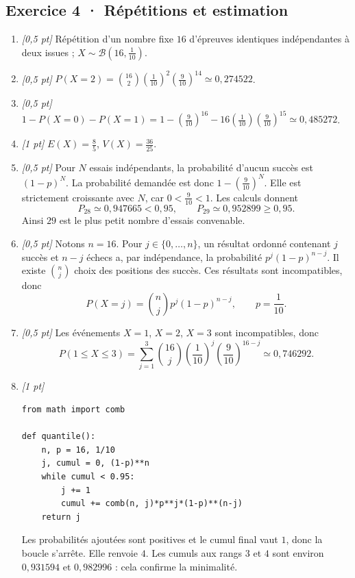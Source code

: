 \subsection*{Exercice 4 · Répétitions et estimation}\begin{enumerate}

\item \textit{[0,5 pt]} Répétition d'un nombre fixe $16$ d'épreuves identiques indépendantes à deux issues ; $X\sim\mathcal B(16,\frac{1}{10})$.

\item \textit{[0,5 pt]} $P(X=2)=\binom{16}2(\frac{1}{10})^2(\frac{9}{10})^{14}\simeq0{,}274522$.

\item \textit{[0,5 pt]} $1-P(X=0)-P(X=1)=1-(\frac{9}{10})^{16}-16(\frac{1}{10})(\frac{9}{10})^{15}\simeq0{,}485272$.

\item \textit{[1 pt]} $E(X)=\frac{8}{5}$, $V(X)=\frac{36}{25}$.

\item \textit{[0,5 pt]} Pour $N$ essais indépendants, la probabilité d'aucun succès est $(1-p)^N$. La probabilité demandée est donc $1-(\frac{9}{10})^N$. Elle est strictement croissante avec $N$, car $0<\frac{9}{10}<1$. Les calculs donnent
\[P_{28}\simeq0{,}947665<0{,}95,\qquad P_{29}\simeq0{,}952899\ge0{,}95.\]
Ainsi $29$ est le plus petit nombre d'essais convenable.

\item \textit{[0,5 pt]} Notons $n=16$. Pour $j\in\{0,\ldots,n\}$, un résultat ordonné contenant $j$ succès et $n-j$ échecs a, par indépendance, la probabilité $p^j(1-p)^{n-j}$. Il existe $\binom nj$ choix des positions des succès. Ces résultats sont incompatibles, donc
\[P(X=j)=\binom nj p^j(1-p)^{n-j},\qquad p=\frac{1}{10}.\]

\item \textit{[0,5 pt]} Les événements $X=1$, $X=2$, $X=3$ sont incompatibles, donc
\[P(1\le X\le3)=\sum_{j=1}^3\binom{16}j(\frac{1}{10})^j(\frac{9}{10})^{16-j}\simeq0{,}746292.\]


\item \textit{[1 pt]} 
\begin{lstlisting}
from math import comb

def quantile():
    n, p = 16, 1/10
    j, cumul = 0, (1-p)**n
    while cumul < 0.95:
        j += 1
        cumul += comb(n, j)*p**j*(1-p)**(n-j)
    return j
\end{lstlisting}
Les probabilités ajoutées sont positives et le cumul final vaut $1$, donc la boucle s'arrête. Elle renvoie $4$. Les cumuls aux rangs $3$ et $4$ sont environ $0{,}931594$ et $0{,}982996$ : cela confirme la minimalité.

\end{enumerate}


